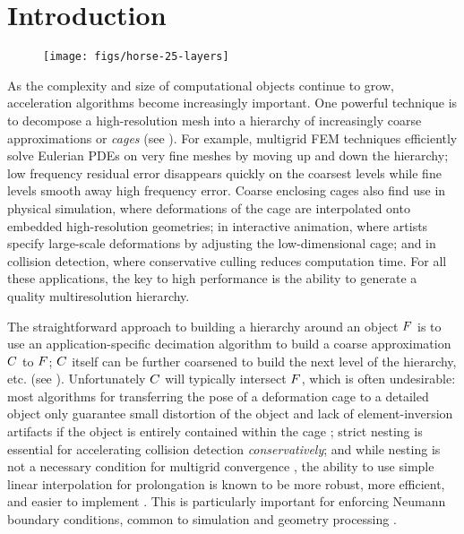 \section{Introduction}
\label{sec:introduction}

\begin{figure}[b]
  \texttt{[image: figs/horse-25-layers]}
  \caption{}
  \label{fig:horse-25-layers}
\end{figure}

As the complexity and size of computational objects continue to grow,
acceleration algorithms become increasingly important. One powerful technique
is to decompose a high-resolution mesh into a hierarchy of increasingly coarse
approximations or \emph{cages} (see ). For example,
multigrid FEM techniques efficiently solve Eulerian PDEs on very fine
meshes by moving up and down the hierarchy; low frequency residual error
disappears quickly on the coarsest levels while fine levels smooth away high
frequency error. Coarse enclosing cages also find use in physical simulation,
where deformations of the cage are interpolated onto embedded high-resolution
geometries; in interactive animation, where artists specify large-scale
deformations by adjusting the low-dimensional cage; and in collision detection,
where conservative culling reduces computation time. For all these
applications, the key to high performance is the ability to generate a quality
multiresolution hierarchy.

The straightforward approach to building a hierarchy around an object $F$
is to use an application-specific decimation algorithm to build a coarse
approximation $C$ to $F$; $C$ itself can be further coarsened to
build the next level of the hierarchy, etc. (see ).
Unfortunately $C$ will typically intersect $F$, which is often
undesirable: most algorithms for transferring the pose of a deformation cage to
a detailed object only guarantee small distortion of the object and lack of
element-inversion artifacts if the object is entirely contained within the cage
\cite{HarmonicCoodinates07,Ben-Chen:2009:VHM}; strict nesting is essential for
accelerating collision detection \emph{conservatively}; and while nesting is
not a necessary condition for multigrid convergence
\cite{Chan96overlappingschwarz}, the ability to use simple linear interpolation
for prolongation is known to be more robust, more efficient, and easier to
implement \cite{chan2000robust,dickopf2010multilevel}. This is
particularly important for enforcing Neumann boundary conditions, common to
simulation and geometry processing \cite{chan1999boundary}.

